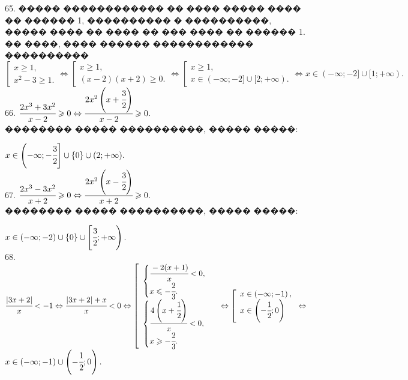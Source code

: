 \documentclass[12pt]{article}
\begin{document}
65. ����� ������������ �� ���� ����� ���� �� ������ 1, ���������� � ����������, ����� ���� �� ���� �� ��� ���� �� ������ 1. �� ����, ���� ������ ������������ ����������\\ $\left[\begin{array}{l}x\geqslant 1,\\ x^2-3 \geqslant1 .  \end{array}\right.\Leftrightarrow
\left[\begin{array}{l}x\geqslant 1,\\ (x-2)(x+2) \geqslant 0 .  \end{array}\right.\Leftrightarrow
\left[\begin{array}{l}x\geqslant 1,\\ x\in (-\infty;-2]\cup[2;+\infty).  \end{array}\right.\Leftrightarrow
x\in (-\infty;-2]\cup[1;+\infty).$\\
66. $\cfrac{2x^3+3x^2}{x-2}\geqslant0\Leftrightarrow\cfrac{2x^2\left(x+\cfrac{3}{2}\right)}{x-2}\geqslant0.$\\ �������� ����� ����������, ����� �����:
\begin{figure}[ht!]
\end{figure}
$x\in\left(-\infty;-\cfrac{3}{2}\right]\cup\{0\}\cup(2;+\infty).$\\
67. $\cfrac{2x^3-3x^2}{x+2}\geqslant0\Leftrightarrow\cfrac{2x^2\left(x-\cfrac{3}{2}\right)}{x+2}\geqslant0.$\\ �������� ����� ����������, ����� �����:
\begin{figure}[ht!]
\end{figure}
$x\in\left(-\infty;-2\right)\cup\{0\}\cup\left[\cfrac{3}{2};+\infty\right).$\\
68. $\cfrac{|3x+2|}{x}<-1\Leftrightarrow\cfrac{|3x+2|+x}{x}<0\Leftrightarrow
\left[\begin{array}{l}\begin{cases}\cfrac{-2(x+1)}{x}<0,\\ x\leqslant-\cfrac{2}{3}.\end{cases}\\ \begin{cases}\cfrac{4\left(x+\cfrac{1}{2}\right)}{x}<0,\\ x\geqslant-\cfrac{2}{3}.\end{cases}  \end{array}\right.\Leftrightarrow\left[\begin{array}{l} x\in\left(-\infty;-1\right),\\
x\in\left(-\cfrac{1}{2};0\right)\end{array}\right.\Leftrightarrow$\\$ x\in\left(-\infty;-1\right)\cup\left(-\cfrac{1}{2};0\right).$\\
\end{document}
